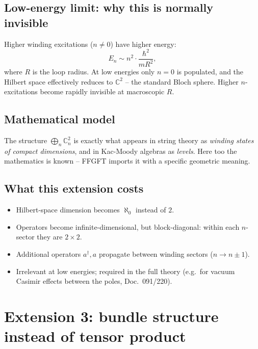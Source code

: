 \subsection{Low-energy limit: why this is normally invisible}

Higher winding excitations ($n \neq 0$) have higher energy:
\begin{equation}
  E_n \sim n^2 \cdot \frac{\hbar^2}{m R^2},
\end{equation}
where $R$ is the loop radius. At low energies only $n = 0$ is
populated, and the Hilbert space effectively reduces to $\mathbb{C}^2$
-- the standard Bloch sphere. Higher $n$-excitations become
rapidly invisible at macroscopic $R$.

\subsection{Mathematical model}

The structure $\bigoplus_n \mathbb{C}^2_n$ is exactly what appears
in string theory as \emph{winding states of compact dimensions},
and in Kac-Moody algebras as \emph{levels}. Here too the mathematics
is known -- FFGFT imports it with a specific geometric meaning.

\subsection{What this extension costs}

\begin{itemize}[leftmargin=2em,itemsep=2pt,topsep=2pt]
  \item Hilbert-space dimension becomes $\aleph_0$ instead of $2$.
  \item Operators become infinite-dimensional, but block-diagonal:
        within each $n$-sector they are $2\times 2$.
  \item Additional operators $a^\dagger, a$ propagate between
        winding sectors ($n \to n \pm 1$).
  \item Irrelevant at low energies; required in the full theory
        (e.g.\ for vacuum Casimir effects between the poles, Doc.~091/220).
\end{itemize}

\section{Extension 3: bundle structure instead of tensor product}

